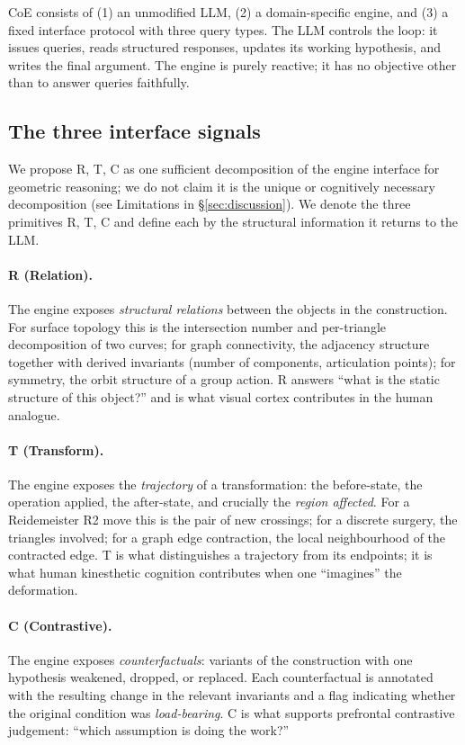 \documentclass{article}
\begin{document}
CoE consists of (1) an unmodified LLM, (2) a domain-specific engine, and (3) a fixed
interface protocol with three query types. The LLM controls the loop: it issues queries,
reads structured responses, updates its working hypothesis, and writes the final
argument. The engine is purely reactive; it has no objective other than to answer
queries faithfully.

\subsection{The three interface signals}

We propose R, T, C as one sufficient decomposition of the engine interface for
geometric reasoning; we do not claim it is the unique or cognitively necessary
decomposition (see Limitations in \S\ref{sec:discussion}). We denote the three primitives
R, T, C and define each by the structural information it returns to the LLM.

\paragraph{R (Relation).}
The engine exposes \emph{structural relations} between the objects in the construction.
For surface topology this is the intersection number and per-triangle decomposition of
two curves; for graph connectivity, the adjacency structure together with derived
invariants (number of components, articulation points); for symmetry, the orbit
structure of a group action. R answers ``what is the static structure of this object?''
and is what visual cortex contributes in the human analogue.

\paragraph{T (Transform).}
The engine exposes the \emph{trajectory} of a transformation: the before-state, the
operation applied, the after-state, and crucially the \emph{region affected}. For a
Reidemeister R2 move this is the pair of new crossings; for a discrete surgery, the
triangles involved; for a graph edge contraction, the local neighbourhood of the
contracted edge. T is what distinguishes a trajectory from its endpoints; it is what
human kinesthetic cognition contributes when one ``imagines'' the deformation.

\paragraph{C (Contrastive).}
The engine exposes \emph{counterfactuals}: variants of the construction with one
hypothesis weakened, dropped, or replaced. Each counterfactual is annotated with the
resulting change in the relevant invariants and a flag indicating whether the original
condition was \emph{load-bearing}. C is what supports prefrontal contrastive
judgement: ``which assumption is doing the work?''
\end{document}
